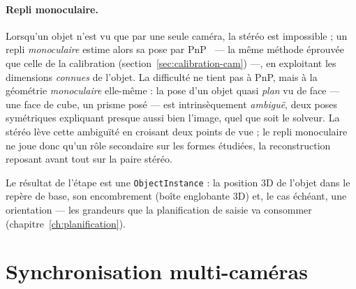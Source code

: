 
\paragraph{Repli monoculaire.} Lorsqu'un objet n'est vu que par une seule caméra, la stéréo est impossible ; un repli \emph{monoculaire} estime alors sa pose par PnP~\cite{lepetit_epnp_2009} --- la même méthode éprouvée que celle de la calibration (section~\ref{sec:calibration-cam}) ---, en exploitant les dimensions \emph{connues} de l'objet. La difficulté ne tient pas à PnP, mais à la géométrie \emph{monoculaire} elle-même : la pose d'un objet quasi \emph{plan} vu de face --- une face de cube, un prisme posé --- est intrinsèquement \emph{ambiguë}, deux poses symétriques expliquant presque aussi bien l'image, quel que soit le solveur. La stéréo lève cette ambiguïté en croisant deux points de vue ; le repli monoculaire ne joue donc qu'un rôle secondaire sur les formes étudiées, la reconstruction reposant avant tout sur la paire stéréo.

Le résultat de l'étape est une \texttt{ObjectInstance} : la position 3D de l'objet dans le repère de base, son encombrement (boîte englobante 3D) et, le cas échéant, une orientation --- les grandeurs que la planification de saisie va consommer (chapitre~\ref{ch:planification}).

\section{Synchronisation multi-caméras}
\label{sec:sync}

